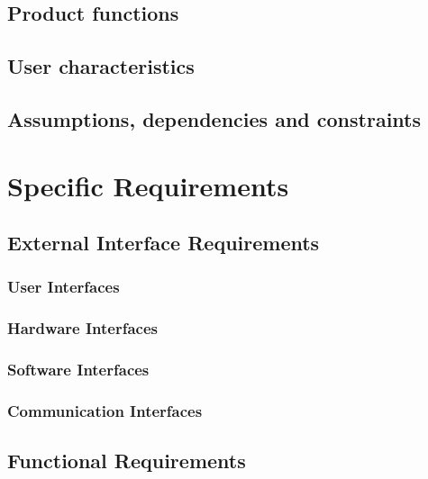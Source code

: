 \documentclass{Configuration_Files/PoliMi3i_thesis}
\begin{document}
    \section{Product functions}\label{sec:product_functions}


    \section{User characteristics}\label{sec:user_characteristics}


    \section{Assumptions, dependencies and constraints}\label{sec:assumptions_dependencies_and_constraints}


    \chapter{Specific Requirements}\label{ch:specific_requirements}


    \section{External Interface Requirements}\label{sec:external_interface_requirements}

    \subsection{User Interfaces}\label{subsec:user_interfaces}

    \subsection{Hardware Interfaces}\label{subsec:hardware_interfaces}

    \subsection{Software Interfaces}\label{subsec:software_interfaces}

    \subsection{Communication Interfaces}\label{subsec:communication_interfaces}


    \section{Functional Requirements}\label{sec:functional_requirements}
\end{document}
